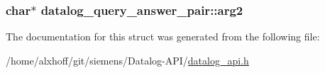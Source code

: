 \subsubsection[{\texorpdfstring{arg2}{arg2}}]{\setlength{\rightskip}{0pt plus 5cm}char$\ast$ datalog\+\_\+query\+\_\+answer\+\_\+pair\+::arg2}\hypertarget{structdatalog__query__answer__pair_a10bde40ebdb18cef34e13cb413a92de1}{}\label{structdatalog__query__answer__pair_a10bde40ebdb18cef34e13cb413a92de1}


The documentation for this struct was generated from the following file\+:\begin{DoxyCompactItemize}
\item 
/home/alxhoff/git/siemens/\+Datalog-\/\+A\+P\+I/\hyperlink{datalog__api_8h}{datalog\+\_\+api.\+h}\end{DoxyCompactItemize}
